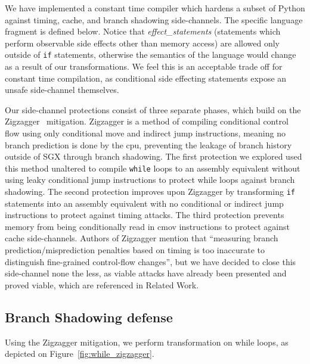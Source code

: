 \documentclass[sigplan, review]{acmart}
\begin{document}
We have implemented a constant time compiler which hardens a subset of Python against timing, cache, and branch shadowing side-channels. The specific language fragment is defined below. Notice that \textit{effect\_statements} (statements which perform observable side effects other than memory access) are allowed only outside of \texttt{if} statements, otherwise the semantics of the language would change as a result of our transformations. We feel this is an acceptable trade off for constant time compilation, as conditional side effecting statements expose an unsafe side-channel themselves.

Our side-channel protections consist of three separate phases, which build on the Zigzagger~\cite{lee2016inferring} mitigation. Zigzagger is a method of compiling conditional control flow using only conditional move and indirect jump instructions, meaning no branch prediction is done by the cpu, preventing the leakage of branch history outside of SGX through branch shadowing. The first protection we explored used this method unaltered to compile \texttt{while} loops to an assembly equivalent without using leaky conditional jump instructions to protect while loops against branch shadowing. The second protection improves upon Zigzagger by transforming \texttt{if} statements into an assembly equivalent with no conditional or indirect jump instructions to protect against timing attacks. The third protection prevents memory from being conditionally read in cmov instructions to protect against cache side-channels. Authors of Zigzagger mention that ``measuring branch prediction/misprediction penalties based on timing is too inaccurate to distinguish fine-grained control-flow changes'', but we have decided to close this side-channel none the less, as viable attacks have already been presented and proved viable, which are referenced in Related Work.

\subsection{Branch Shadowing defense}
Using the Zigzagger mitigation, we perform transformation on while loops, as depicted on Figure~\ref{fig:while_zigzagger}.
\end{document}

